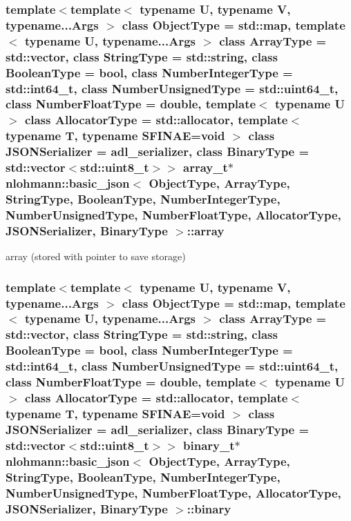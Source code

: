 \subsubsection[{\texorpdfstring{array}{array}}]{\setlength{\rightskip}{0pt plus 5cm}template$<$template$<$ typename U, typename V, typename...\+Args $>$ class Object\+Type = std\+::map, template$<$ typename U, typename...\+Args $>$ class Array\+Type = std\+::vector, class String\+Type  = std\+::string, class Boolean\+Type  = bool, class Number\+Integer\+Type  = std\+::int64\+\_\+t, class Number\+Unsigned\+Type  = std\+::uint64\+\_\+t, class Number\+Float\+Type  = double, template$<$ typename U $>$ class Allocator\+Type = std\+::allocator, template$<$ typename T, typename S\+F\+I\+N\+A\+E=void $>$ class J\+S\+O\+N\+Serializer = adl\+\_\+serializer, class Binary\+Type  = std\+::vector$<$std\+::uint8\+\_\+t$>$$>$ {\bf array\+\_\+t}$\ast$ {\bf nlohmann\+::basic\+\_\+json}$<$ Object\+Type, Array\+Type, String\+Type, Boolean\+Type, Number\+Integer\+Type, Number\+Unsigned\+Type, Number\+Float\+Type, Allocator\+Type, J\+S\+O\+N\+Serializer, Binary\+Type $>$\+::array\hspace{0.3cm}{\ttfamily [private]}}\hypertarget{classnlohmann_1_1basic__json_ad2b075c694e4564c9742d2c8db7c7c5f}{}\label{classnlohmann_1_1basic__json_ad2b075c694e4564c9742d2c8db7c7c5f}


array (stored with pointer to save storage) 

\subsubsection[{\texorpdfstring{binary}{binary}}]{\setlength{\rightskip}{0pt plus 5cm}template$<$template$<$ typename U, typename V, typename...\+Args $>$ class Object\+Type = std\+::map, template$<$ typename U, typename...\+Args $>$ class Array\+Type = std\+::vector, class String\+Type  = std\+::string, class Boolean\+Type  = bool, class Number\+Integer\+Type  = std\+::int64\+\_\+t, class Number\+Unsigned\+Type  = std\+::uint64\+\_\+t, class Number\+Float\+Type  = double, template$<$ typename U $>$ class Allocator\+Type = std\+::allocator, template$<$ typename T, typename S\+F\+I\+N\+A\+E=void $>$ class J\+S\+O\+N\+Serializer = adl\+\_\+serializer, class Binary\+Type  = std\+::vector$<$std\+::uint8\+\_\+t$>$$>$ {\bf binary\+\_\+t}$\ast$ {\bf nlohmann\+::basic\+\_\+json}$<$ Object\+Type, Array\+Type, String\+Type, Boolean\+Type, Number\+Integer\+Type, Number\+Unsigned\+Type, Number\+Float\+Type, Allocator\+Type, J\+S\+O\+N\+Serializer, Binary\+Type $>$\+::binary\hspace{0.3cm}{\ttfamily [private]}}\hypertarget{classnlohmann_1_1basic__json_a9a4a1bb634091c7ebd66c4e989ed469d}{}\label{classnlohmann_1_1basic__json_a9a4a1bb634091c7ebd66c4e989ed469d}


